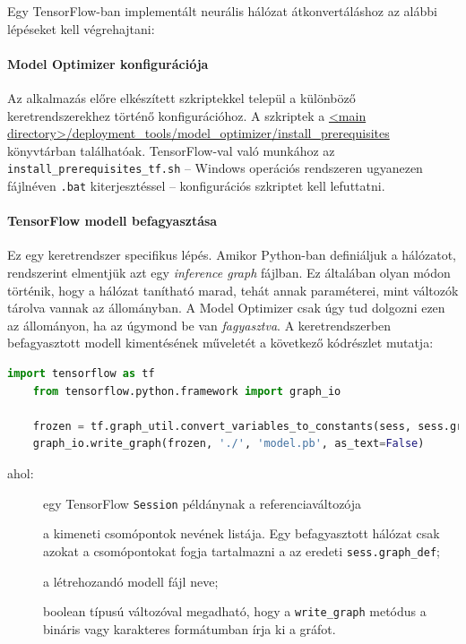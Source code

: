 Egy TensorFlow-ban implementált neurális hálózat átkonvertáláshoz az alábbi lépéseket kell végrehajtani:
\paragraph*{Model Optimizer konfigurációja}
	Az alkalmazás előre elkészített szkriptekkel települ a különböző keretrendszerekhez történő konfigurációhoz. A szkriptek a \url{<main directory>/deployment_tools/model_optimizer/install_prerequisites} könyvtárban találhatóak. TensorFlow-val való munkához az \verb|install_prerequisites_tf.sh| -- Windows operációs rendszeren ugyanezen fájlnéven \verb|.bat| kiterjesztéssel -- konfigurációs szkriptet kell lefuttatni.

\paragraph*{TensorFlow modell befagyasztása}
	Ez egy keretrendszer specifikus lépés. Amikor Python-ban definiáljuk a hálózatot, rendszerint elmentjük azt egy \emph{inference graph} fájlban. Ez általában olyan módon történik, hogy a hálózat tanítható marad, tehát annak paraméterei, mint változók tárolva vannak az állományban. A Model Optimizer csak úgy tud dolgozni ezen az állományon, ha az úgymond be van \emph{fagyasztva}. A keretrendszerben befagyasztott modell kimentésének műveletét a következő kódrészlet mutatja:
	\begin{lstlisting}[language=Python]
	import tensorflow as tf
	from tensorflow.python.framework import graph_io
	
	frozen = tf.graph_util.convert_variables_to_constants(sess, sess.graph_def, ["output_node"])
	graph_io.write_graph(frozen, './', 'model.pb', as_text=False)
	\end{lstlisting}
	ahol:
	\begin{description}
		\item[] egy TensorFlow \verb|Session| példánynak a referenciaváltozója
		\item[] a kimeneti csomópontok nevének listája. Egy befagyasztott hálózat csak azokat a csomópontokat fogja tartalmazni a az eredeti \verb|sess.graph_def|;
		\item[] a létrehozandó modell fájl neve;
		\item[] boolean típusú változóval megadható, hogy a \verb|write_graph| metódus a bináris vagy karakteres formátumban írja ki a gráfot.
	\end{description}

